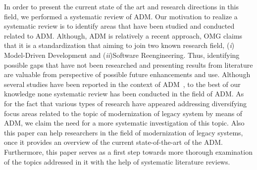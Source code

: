 In order to  present the current state of the art and research directions in this field, we performed a systematic review of ADM. Our motivation to realize a systematic review is to identify areas that have been studied and conducted related to ADM. Although, ADM is relatively a recent approach, OMG claims that it is a standardization that aiming to join two known research field, (\textit{i}) Model-Driven Development and (\textit{ii})Software Reengineering. Thus, identifying possible gaps that have not been researched and presenting results from literature are valuable from perspective of possible future enhancements and use.  Although several studies have been reported in the context of ADM~\cite{PerezCastillo20121370, SMR:SMR582, FuentesFernandez2012247, PrezCastillo2011519}, to the best of our knowledge none systematic review has been conducted in the field of ADM. As for the fact that various types of research have appeared addressing diversifying focus areas related to the topic of modernization of legacy system by means of ADM, we claim the need for a more systematic investigation of this topic. Also this paper can help researchers in the field of modernization of legacy systems, once it provides an overview of the current state-of-the-art of the ADM. Furthermore, this paper serves as a first step towards more thorough examination of the topics addressed in it with the help of systematic literature reviews.





